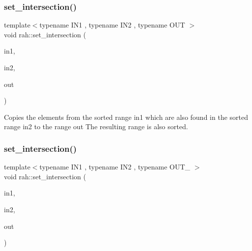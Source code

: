 \subsubsection{\texorpdfstring{set\_intersection()}{set\_intersection()}\hspace{0.1cm}{\footnotesize\ttfamily [1/2]}}
{\footnotesize\ttfamily template$<$typename I\+N1 , typename I\+N2 , typename O\+UT $>$ \\
void rah\+::set\+\_\+intersection (\begin{DoxyParamCaption}\item[{I\+N1 \&\&}]{in1,  }\item[{I\+N2 \&\&}]{in2,  }\item[{O\+UT \&\&}]{out }\end{DoxyParamCaption})}



Copies the elements from the sorted range in1 which are also found in the sorted range in2 to the range out The resulting range is also sorted. 


\begin{DoxyCodeInclude}{0}
\end{DoxyCodeInclude}
\mbox{\label{namespacerah_a8819752794096b634c6153560fc21cc5}} 
\subsubsection{\texorpdfstring{set\_intersection()}{set\_intersection()}\hspace{0.1cm}{\footnotesize\ttfamily [2/2]}}
{\footnotesize\ttfamily template$<$typename I\+N1 , typename I\+N2 , typename O\+U\+T\+\_\+ $>$ \\
void rah\+::set\+\_\+intersection (\begin{DoxyParamCaption}\item[{I\+N1 \&\&}]{in1,  }\item[{I\+N2 \&\&}]{in2,  }\item[{O\+U\+T\+\_\+ \&\&}]{out }\end{DoxyParamCaption})}



